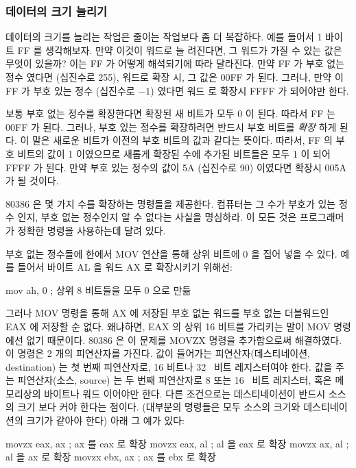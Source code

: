 \subsubsection{데이터의 크기 늘리기}

데이터의 크기를 늘리는 작업은 줄이는 작업보다 좀 더 복잡하다.
예를 들어서 1 바이트 FF 를 생각해보자. 만약 이것이 워드로 늘
려진다면, 그 워드가 가질 수 있는 값은 무엇이 있을까? 이는 FF
가 어떻게 해석되기에 따라 달라진다. 만약 FF 가 부호 없는 정수
였다면 (십진수로 255), 워드로 확장 시, 그 값은 00FF 가 된다.
그러나, 만약 이 FF 가 부호 있는 정수 (십진수로 $-1$) 였다면 워드
로 확장시 FFFF 가 되어야만 한다. 

보통 부호 없는 정수를 확장한다면 확장된 새 비트가 모두 0 이 된다. 따라서
FF 는 00FF 가 된다. 그러나, 부호 있는 정수를 확장하려면 반드시 부호 비트를
\emph{확장} 하게 된다.  이 말은 새로운 비트가 이전의
부호 비트의 값과 같다는 뜻이다. 따라서, FF 의 부호 비트의 값이 1 이였으므로
새롭게 확장된 수에 추가된 비트들은 모두 1 이 되어 FFFF 가 된다. 만약 부호 
있는 정수의 값이 5A (십진수로 90) 이였다면 확장시 005A 가 될 것이다. 

80386 은 몇 가지 수를 확장하는 명령들을 제공한다. 컴퓨터는 그 수가 부호가 있는
정수 인지, 부호 없는 정수인지 알 수 없다는 사실을 명심하라. 이 모든 것은
프로그래머가 정확한 명령을 사용하는데 달려 있다. 

부호 없는 정수들에 한에서 {\code MOV} 연산을 통해 상위 비트에 0 을 집어 
넣을 수 있다. 예를 들어서 바이트 AL 을 워드 AX 로 확장시키기 위해선:
\begin{AsmCodeListing}[numbers=none,frame=none]
      mov    ah, 0   ; 상위 8 비트들을 모두 0 으로 만듦
\end{AsmCodeListing}

그러나 {\code MOV} 명령을 통해 AX 에 저장된 부호 없는 워드를 부호 없는
더블워드인 EAX 에 저장할 순 없다. 왜냐하면, EAX 의 상위 16 비트를 가리키는
말이 {\code MOV} 명령에선 없기 때문이다. 80386 은 이 문제를 {\code MOVZX}
명령을 추가함으로써 해결하였다.  이 명령은 2 개의 피연산자를
가진다. 값이 들어가는 피연산자(데스티네이션, destination) 는 첫 번째 피연산자로, 16 비트나 
32~ 비트 레지스터여야 한다. 값을 주는 피연산자(소스, source) 는 두 번째 피연산자로
8 또는 16~ 비트 레지스터, 혹은 메모리상의 바이트나 워드 이어야만 한다. 
다른 조건으로는 데스티네이션이 반드시 소스의 크기 보다 커야 한다는 점이다. 
(대부분의 명령들은 모두 소스의 크기와 데스티네이션의 크기가 같아야 한다)
아래 그 예가 있다:

\begin{AsmCodeListing}[numbers=none,frame=none]
      movzx  eax, ax      ; ax 를 eax 로 확장
      movzx  eax, al      ; al 을 eax 로 확장
      movzx  ax, al       ; al 을 ax 로 확장
      movzx  ebx, ax      ; ax 를 ebx 로 확장
\end{AsmCodeListing}

